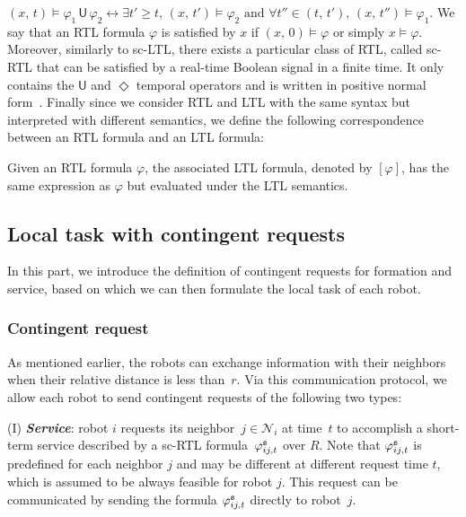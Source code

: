 $(x,\,t)\models \varphi_1\, \mathsf{U} \, \varphi_2   \leftrightarrow   \exists t'\geq t,\, (x,\, t')\models \varphi_2 \,\, \text{and}\,\, \forall t''\in (t,\, t'),\, (x,\, t'')\models \varphi_1$.
We say that an RTL formula $\varphi$ is satisfied by $x$ if $(x,\, 0)\models \varphi$ or simply $x\models \varphi$.
Moreover, similarly to sc-LTL, there exists a particular class of RTL, called sc-RTL that can be satisfied by a real-time Boolean signal in a finite time. It only contains the $\textsf{U}$ and $\Diamond$ temporal operators and is written in positive normal form~\cite{fainekos2009temporal}.
Finally since we consider RTL and LTL with the same syntax but interpreted with different semantics, we define the following correspondence between an RTL formula and an LTL formula:

\begin{definition}\label{ch03:def:RTL-LTL}
Given an RTL formula $\varphi$, the associated LTL formula, denoted by $[\varphi]$, has the same expression as $\varphi$ but evaluated under the LTL semantics.
\end{definition}


\subsection{Local task with contingent requests}
In this part, we introduce the definition of contingent requests for formation and service, based on which we can then formulate the local task of each robot.

\subsubsection{Contingent request}\label{ch03:sec:cont-prop}

As mentioned earlier, the robots can exchange information with their neighbors when their relative distance is less than~$r$.
Via this communication protocol, we allow each robot to send contingent requests of the following two types:

(I) \textbf{\emph{Service}}: robot $i$ requests its neighbor~$j\in \mathcal{N}_i$  at time~$t$ to accomplish a short-term service described by a sc-RTL formula~$\varphi_{ij,t}^\textup{\texttt{s}}$ over $R$. Note that $\varphi_{ij,t}^\textup{\texttt{s}}$ is predefined for each neighbor $j$ and may be different at different request time $t$, which is assumed to be always feasible for robot $j$.
This request can be communicated by sending the formula $\varphi_{ij,t}^\textup{\texttt{s}}$ directly to robot~$j$.



